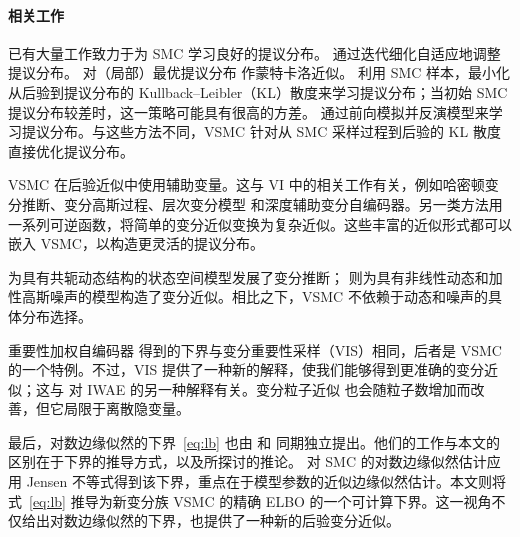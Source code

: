 \paragraph{相关工作}
已有大量工作致力于为 SMC 学习良好的提议分布\citep{Cornebise2009}。\citet{Guarniero2015} 通过迭代细化自适应地调整提议分布。\citet{naessethLS2015nested} 对（局部）最优提议分布\citep{doucet2009tutorial} 作蒙特卡洛近似。\citet{Gu2015} 利用 SMC 样本，最小化从后验到提议分布的 Kullback–Leibler（KL）散度来学习提议分布；当初始 SMC 提议分布较差时，这一策略可能具有很高的方差。\citet{Paige2016} 通过前向模拟并反演模型来学习提议分布。与这些方法不同，VSMC 针对从 SMC 采样过程到后验的 KL 散度直接优化提议分布。

VSMC 在后验近似中使用辅助变量。这与 VI 中的相关工作有关，例如哈密顿变分推断\citep{Salimans2015}、变分高斯过程\citep{Tran2016}、层次变分模型\citep{Ranganath2016} 和深度辅助变分自编码器\citep{Maaloe2016}。另一类方法用一系列可逆函数，将简单的变分近似变换为复杂近似\citep{Rezende2015,dinh2014nice}。这些丰富的近似形式都可以嵌入 VSMC，以构造更灵活的提议分布。

\citet{Archer2015,Johnson2016} 为具有共轭动态结构的状态空间模型发展了变分推断；\citet{Krishnan2017} 则为具有非线性动态和加性高斯噪声的模型构造了变分近似。相比之下，VSMC 不依赖于动态和噪声的具体分布选择。

重要性加权自编码器\citep{Burda2016} 得到的下界与变分重要性采样（VIS）相同，后者是 VSMC 的一个特例。不过，VIS 提供了一种新的解释，使我们能够得到更准确的变分近似；这与 \citet{Cremer2017,Bachman2015} 对 IWAE 的另一种解释有关。变分粒子近似\citep{saeedi2014variational} 也会随粒子数增加而改善，但它局限于离散隐变量。

最后，对数边缘似然的下界~\eqref{eq:lb} 也由 \citet{Maddison2017} 和 \citet{Le2017aesmc} 同期独立提出。他们的工作与本文的区别在于下界的推导方式，以及所探讨的推论。\citet{Maddison2017,Le2017aesmc} 对 SMC 的对数边缘似然估计应用 Jensen 不等式得到该下界，重点在于模型参数的近似边缘似然估计。本文则将式~\eqref{eq:lb} 推导为新变分族 VSMC 的精确 ELBO 的一个可计算下界。这一视角不仅给出对数边缘似然的下界，也提供了一种新的后验变分近似。
